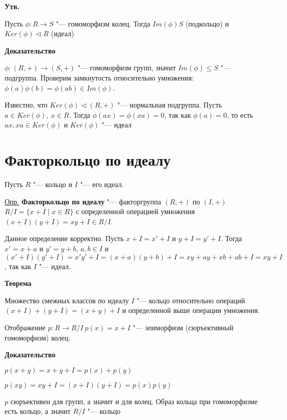 \documentclass{article}
\begin{document}
\vspace{5pt}

\textbf{Утв.}

Пусть $\phi: R \rightarrow S$ "--- гомоморфизм колец. Тогда $Im(\phi) S$ (подкольцо) и $Ker(\phi) \triangleleft R$ (идеал)

\vspace{5pt}

\textbf{Доказательство}

$\phi: (R, +) \rightarrow (S, +)$ "--- гомоморфизм групп, значит $Im(\phi) \leq S$ "--- подгруппа. Проверим замкнутость относительно умножения: $\phi(a)\phi(b) = \phi(ab) \in Im(\phi)$.

Известно, что $Ker(\phi) \triangleleft (R, +)$ "--- нормальная подгруппа. Пусть $a \in Ker(\phi)$, $x \in R$. Тогда $\phi(ax) = \phi(xa) = 0$, так как $\phi(a) = 0$, то есть $ax, xa \in Ker(\phi)$ и $Ker(\phi)$ "--- идеал

\section{Факторкольцо по идеалу}

Пусть $R$ "--- кольцо и $I$ "--- его идеал.

\underline{Опр.} \textbf{Факторкольцо по идеалу} "--- факторгруппа $(R, +)$ по $(I, +)$ $R / I = \{x + I \mid x \in R\}$ с определенной операцией умножения $(x + I)(y + I) = xy + I \in R / I$.

Данное определение корректно. Пусть $x + I = x' + I$ и $y + I = y' + I$. Тогда $x' = x + a$ и $y' = y + b$, $a, b \in I$ и $(x' + I)(y' + I) = x'y' + I = (x + a)(y + b) + I = xy + ay + xb + ab + I = xy + I$, так как $I$ "--- идеал.

\vspace{10pt}

\textbf{Теорема}

Множество смежных классов по идеалу $I$ "--- кольцо относительно операций $(x + I) + (y + I) = (x + y) + I$ и определенной выше операции умножения.

Отображение $p: R \rightarrow R / I \ p(x) = x + I$ "--- эпиморфизм (сюръективный гомоморфизм) колец.

\vspace{5pt}

\textbf{Доказательство}

$p(x + y) = x + y + I = p(x) + p(y)$

$p(xy) = xy + I = (x + I)(y + I) = p(x)p(y)$

$p$ сюръективен для групп, а значит и для колец. Образ кольца при гомоморфизме есть кольцо, а значит $R / I$ "--- кольцо
\end{document}

